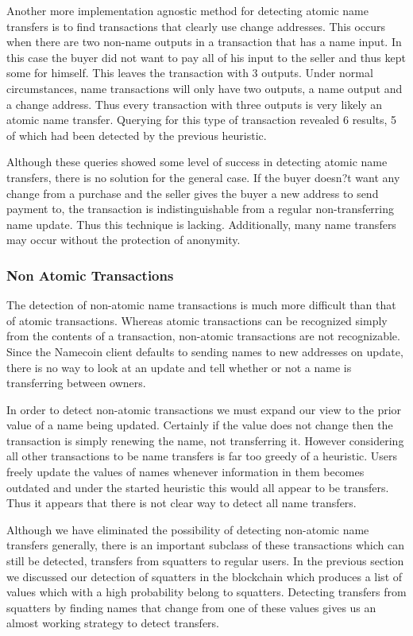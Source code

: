 Another more implementation agnostic method for detecting atomic name transfers is to find transactions that clearly use change addresses. This occurs when there are two non-name outputs in a transaction that has a name input. In this case the buyer did not want to pay all of his input to the seller and thus kept some for himself. This leaves the transaction with 3 outputs. Under normal circumstances, name transactions will only have two outputs, a name output and a change address. Thus every transaction with three outputs is very likely an atomic name transfer. Querying for this type of transaction revealed 6 results, 5 of which had been detected by the previous heuristic.

Although these queries showed some level of success in detecting atomic name transfers, there is no solution for the general case. If the buyer doesn?t want any change from a purchase and the seller gives the buyer a new address to send payment to, the transaction is indistinguishable from a regular non-transferring name update. Thus this technique is lacking. Additionally, many name transfers may occur without the protection of anonymity.

\subsubsection{Non Atomic Transactions}

The detection of non-atomic name transactions is much more difficult than that of atomic transactions. Whereas atomic transactions can be recognized simply from the contents of a transaction, non-atomic transactions are not recognizable.  Since the Namecoin client defaults to sending names to new addresses on update, there is no way to look at an update and tell whether or not a name is transferring between owners.

In order to detect non-atomic transactions we must expand our view to the prior value of a name being updated. Certainly if the value does not change then the transaction is simply renewing the name, not transferring it. However considering all other transactions to be name transfers is far too greedy of a heuristic. Users freely update the values of names whenever information in them becomes outdated and under the started heuristic this would all appear to be transfers. Thus it appears that there is not clear way to detect all name transfers.

Although we have eliminated the possibility of detecting non-atomic name transfers generally, there is an important subclass of these transactions which can still be detected, transfers from squatters to regular users. In the previous section we discussed our detection of squatters in the blockchain which produces a list of values which with a high probability belong to squatters. Detecting transfers from squatters by finding names that change from one of these values gives us an almost working strategy to detect transfers.


